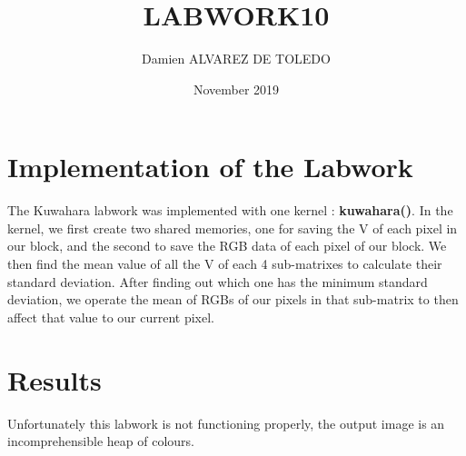 \documentclass{article}
\title{LABWORK10}
\author{Damien ALVAREZ DE TOLEDO }
\date{November 2019}
\begin{document}
\maketitle

\section{Implementation of the Labwork}\newline

The Kuwahara labwork was implemented with one kernel : \textbf{kuwahara()}. In the kernel, we first create two shared memories, one for  saving the V of each pixel in our block, and the second to save the RGB data of each pixel of our block. We then find the mean value of all the V of each 4 sub-matrixes to calculate their standard deviation. After finding out which one has the minimum standard deviation, we operate the mean of RGBs of our pixels in that sub-matrix to then affect that value to our current pixel.\newline

\section{Results}\newline

Unfortunately this labwork is not functioning properly, the output image is an incomprehensible heap of colours.   
\end{document}
